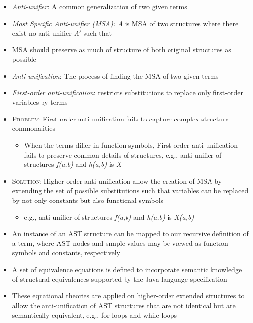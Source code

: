 \documentclass{article}
\newcommand{\itt}{\textit}
\newcommand{\vars}{\textit}
\newcommand{\tsc}{\textsc}
\begin{document}
\begin{itemize} [leftmargin=.1in]
\item \itt{Anti-unifier}: A common generalization of two given terms
\item \itt{Most Specific Anti-unifier (MSA):} \vars{A} is MSA of two structures where there exist no anti-unifier \vars{A}${\prime}$ such that
\item MSA should preserve as much of structure of both original structures as possible
\item \itt{Anti-unification}: The process of finding the MSA of two given terms
\item \itt{First-order anti-unification}: restricts substitutions to replace only first-order variables by terms

\item \tsc{Problem:} First-order anti-unification fails to capture complex structural commonalities
	\begin{itemize}
	\item When the terms differ in function symbols, First-order anti-unification fails to preserve common details of structures, e.g., anti-unifier of structures \vars{f(a,b)} and \vars{h(a,b)} is \vars{X}
	\end{itemize}
\item \tsc{Solution:} Higher-order anti-unification allow the creation of MSA by extending the set of possible substitutions such that variables can be replaced by not only constants but also functional symbols
\begin{itemize}
\item e.g., anti-unifier of structures \vars{f(a,b)} and \vars{h(a,b)} is \vars{X(a,b)}
\end{itemize}
\item An instance of an AST structure can be mapped  to our recursive definition of a term, where AST nodes and simple values may be viewed as function-symbols and constants, respectively

\item A set of equivalence equations is defined to incorporate semantic knowledge of structural equivalences supported by the Java language specification
\item These equational theories are applied on higher-order extended structures to allow the anti-unification of AST structures that are not identical but are semantically equivalent, e.g., for-loops and while-loops


\end{itemize}
\end{document}
